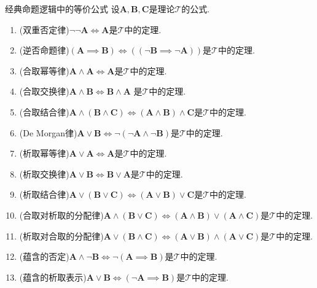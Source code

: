 \begin{metatheorem}{经典命题逻辑中的等价公式}{}
	设$\boldsymbol{A},\boldsymbol{B},\boldsymbol{C}$是理论$\mathcal{T}$的公式.
	\begin{enumerate}
		\item (双重否定律)$\neg\neg\boldsymbol{A}\iff\boldsymbol{A}$是$\mathcal{T}$中的定理.
		\item (逆否命题律)$\left(\boldsymbol{A}\implies\boldsymbol{B}\right)\iff\left(\left(\neg\boldsymbol{B}\implies\neg\boldsymbol{A}\right)\right)$是$\mathcal{T}$中的定理.
		\item (合取幂等律)$\boldsymbol{A}\wedge\boldsymbol{A}\iff\boldsymbol{A}$是$\mathcal{T}$中的定理.
		\item (合取交换律)$\boldsymbol{A}\wedge\boldsymbol{B}\iff\boldsymbol{B}\wedge\boldsymbol{A}$	是$\mathcal{T}$中的定理.
		\item (合取结合律)$\boldsymbol{A}\wedge\left(\boldsymbol{B}\wedge\boldsymbol{C}\right)\iff\left(\boldsymbol{A}\wedge\boldsymbol{B}\right)\wedge\boldsymbol{C}$是$\mathcal{T}$中的定理.
		\item (De Morgan律)$\boldsymbol{A}\vee\boldsymbol{B}\iff\neg\left(\neg\boldsymbol{A}\wedge\neg\boldsymbol{B}\right)$是$\mathcal{T}$中的定理.
		\item (析取幂等律)$\boldsymbol{A}\vee\boldsymbol{A}\iff\boldsymbol{A}$是$\mathcal{T}$中的定理.
		\item (析取交换律)$\boldsymbol{A}\vee\boldsymbol{B}\iff\boldsymbol{B}\vee\boldsymbol{A}$是$\mathcal{T}$中的定理.
		\item (析取结合律)$\boldsymbol{A}\vee\left(\boldsymbol{B}\vee\boldsymbol{C}\right)\iff\left(\boldsymbol{A}\vee\boldsymbol{B}\right)\vee\boldsymbol{C}$是$\mathcal{T}$中的定理.
		\item (合取对析取的分配律)$\boldsymbol{A}\wedge\left(\boldsymbol{B}\vee\boldsymbol{C}\right)\iff\left(\boldsymbol{A}\wedge\boldsymbol{B}\right)\vee\left(\boldsymbol{A}\wedge\boldsymbol{C}\right)$是$\mathcal{T}$中的定理.
		\item (析取对合取的分配律)$\boldsymbol{A}\vee\left(\boldsymbol{B}\wedge\boldsymbol{C}\right)\iff\left(\boldsymbol{A}\vee\boldsymbol{B}\right)\wedge\left(\boldsymbol{A}\vee\boldsymbol{C}\right)$是$\mathcal{T}$中的定理.
		\item (蕴含的否定)$\boldsymbol{A}\wedge\neg\boldsymbol{B}\iff\neg\left(\boldsymbol{A}\implies\boldsymbol{B}\right)$是$\mathcal{T}$中的定理.
		\item (蕴含的析取表示)$\boldsymbol{A}\vee\boldsymbol{B}\iff\left(\neg\boldsymbol{A}\implies\boldsymbol{B}\right)$是$\mathcal{T}$中的定理.
	\end{enumerate}
\end{metatheorem}

